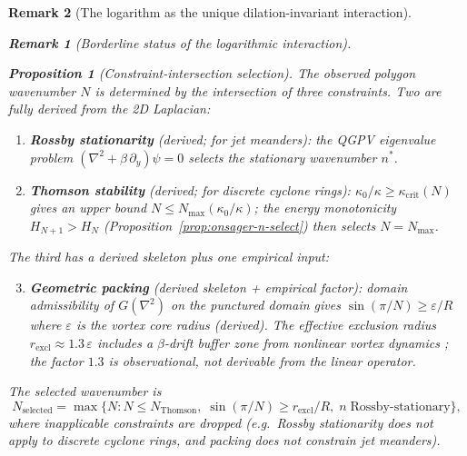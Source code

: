 \documentclass[12pt, a4paper]{article}
\newtheorem{proposition}[theorem]{Proposition}
\newtheorem{remark}{Remark}[section]
\numberwithin{equation}{section}
\begin{document}
\begin{remark}[The logarithm as the unique dilation-invariant interaction]
\begin{remark}[Borderline status of the logarithmic interaction]
\begin{proposition}[Constraint-intersection selection]\label{prop:complementary}
The observed polygon wavenumber $N$ is determined by the intersection of
three constraints.  Two are fully derived from the 2D Laplacian:
\begin{enumerate}
  \item \textbf{Rossby stationarity} (derived; for jet meanders):
    the QGPV eigenvalue problem
    $(\nabla^2 + \beta\,\partial_y)\psi = 0$ selects the stationary
    wavenumber $n^*$.
  \item \textbf{Thomson stability} (derived; for discrete cyclone rings):
    $\kappa_0/\kappa \ge \kappa_{\mathrm{crit}}(N)$ gives an upper
    bound $N \le N_{\max}(\kappa_0/\kappa)$; the energy monotonicity
    $H_{N+1} > H_N$ (Proposition~\ref{prop:onsager-n-select}) then
    selects $N = N_{\max}$.
\end{enumerate}
The third has a derived skeleton plus one empirical input:
\begin{enumerate}\setcounter{enumi}{2}
  \item \textbf{Geometric packing} (derived skeleton + empirical factor):
    domain admissibility of $G(\nabla^2)$ on the punctured domain
    gives $\sin(\pi/N) \ge \varepsilon/R$ where $\varepsilon$ is
    the vortex core radius (derived).  The effective exclusion radius
    $r_{\mathrm{excl}} \approx 1.3\,\varepsilon$ includes a
    $\beta$-drift buffer zone from nonlinear vortex dynamics
    \citep{Gavriel2021}; the factor $1.3$ is observational, not
    derivable from the linear operator.
\end{enumerate}
The selected wavenumber is
\begin{equation}\label{eq:constraint-intersection}
  N_{\mathrm{selected}} = \max\bigl\{N :
    N \le N_{\mathrm{Thomson}},\;
    \sin(\pi/N) \ge r_{\mathrm{excl}}/R,\;
    n\;\text{Rossby-stationary}\bigr\},
\end{equation}
where inapplicable constraints are dropped (e.g.\ Rossby stationarity
does not apply to discrete cyclone rings, and packing does not constrain
jet meanders).
\end{proposition}


\end{remark}
\end{remark}
\end{document}
